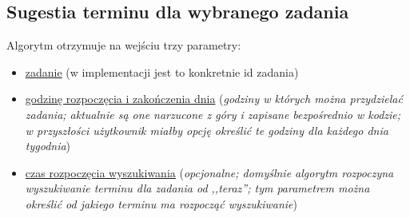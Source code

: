 \documentclass[pdflatex,11pt]{aghdpl}
\begin{document}
\subsection{Sugestia terminu dla wybranego zadania}
\label{sec:algJednoZadanie}

Algorytm otrzymuje na wejściu trzy parametry:
\begin{itemize}
\item \underline{zadanie} (w implementacji jest to konkretnie id zadania)
\item \underline{godzinę rozpoczęcia i zakończenia dnia} (\textit{godziny w których można przydzielać zadania; aktualnie są one narzucone z góry i zapisane bezpośrednio w kodzie; w przyszłości użytkownik miałby opcję określić te godziny dla każdego dnia tygodnia})
\item \underline{czas rozpoczęcia wyszukiwania} (\textit{opcjonalne; domyślnie algorytm rozpoczyna wyszukiwanie terminu dla zadania od ,,teraz''; tym parametrem można określić od jakiego terminu ma rozpocząć wyszukiwanie})
\end{itemize}
\end{document}
